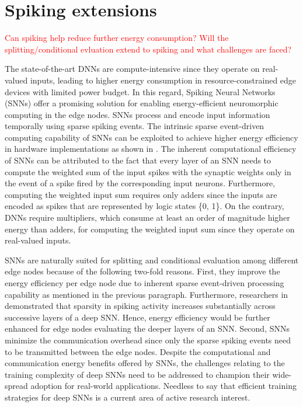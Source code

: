 \section{Spiking extensions}
\label{sec:spiking}
\textcolor{red}{Can spiking help reduce further energy consumption? Will the splitting/conditional evluation extend to spiking and what challenges are faced?}

The state-of-the-art DNNs are compute-intensive since they operate on real-valued inputs, leading to higher energy consumption in resource-constrained edge devices with limited power budget. In this regard, Spiking Neural Networks (SNNs) offer a promising solution for enabling energy-efficient neuromorphic computing in the edge nodes. SNNs process and encode input information temporally using sparse spiking events. The intrinsic sparse event-driven computing capability of SNNs can be exploited to achieve higher energy efficiency in hardware implementations as shown in \cite{sengupta2019going, blouw2018benchmarking}. The inherent computational efficiency of SNNs can be attributed to the fact that every layer of an SNN needs to compute the weighted sum of the input spikes with the synaptic weights only in the event of a spike fired by the corresponding input neurons. Furthermore, computing the weighted input sum requires only adders since the inputs are encoded as spikes that are represented by logic states \{0, 1\}. On the contrary, DNNs require multipliers, which consume at least an order of magnitude higher energy than adders, for computing the weighted input sum since they operate on real-valued inputs.

SNNs are naturally suited for splitting and conditional evaluation among different edge nodes because of the following two-fold reasons. First, they improve the energy efficiency per edge node due to inherent sparse event-driven processing capability as mentioned in the previous paragraph. Furthermore, researchers in \cite{sengupta2019going} demonstrated that sparsity in spiking activity increases substantially across successive layers of a deep SNN. Hence, energy efficiency would be further enhanced for edge nodes evaluating the deeper layers of an SNN. Second, SNNs minimize the communication overhead since only the sparse spiking events need to be transmitted between the edge nodes. Despite the computational and communication energy benefits offered by SNNs, the challenges relating to the training complexity of deep SNNs need to be addressed to champion their wide-spread adoption for real-world applications. Needless to say that efficient training strategies for deep SNNs is a current area of active research interest.

